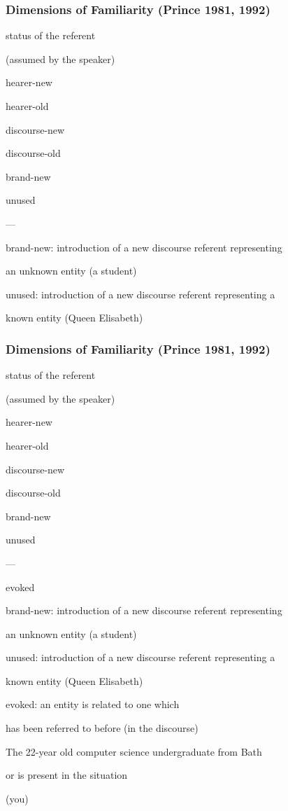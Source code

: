 \documentclass[compress,color=usenames]{beamer}
\begin{document}
\begin{frame}
\frametitle{Dimensions of Familiarity (Prince 1981, 1992)}

status of the referent

(assumed by the speaker)

hearer-new

hearer-old

discourse-new

discourse-old

brand-new

unused

---

brand-new: introduction of a new discourse referent representing

an unknown entity (a student)

unused: introduction of a new discourse referent representing a

known entity (Queen Elisabeth)

\end{frame}

\begin{frame}
\frametitle{Dimensions of Familiarity (Prince 1981, 1992)}

status of the referent

(assumed by the speaker)

hearer-new

hearer-old

discourse-new

discourse-old

brand-new

unused

---

evoked

brand-new: introduction of a new discourse referent representing

an unknown entity (a student)

unused: introduction of a new discourse referent representing a

known entity (Queen Elisabeth)

evoked: an entity is related to one which

has been referred to before (in the discourse)

The 22-year old computer science undergraduate from Bath

or is present in the situation

(you)

\end{frame}
\end{document}
